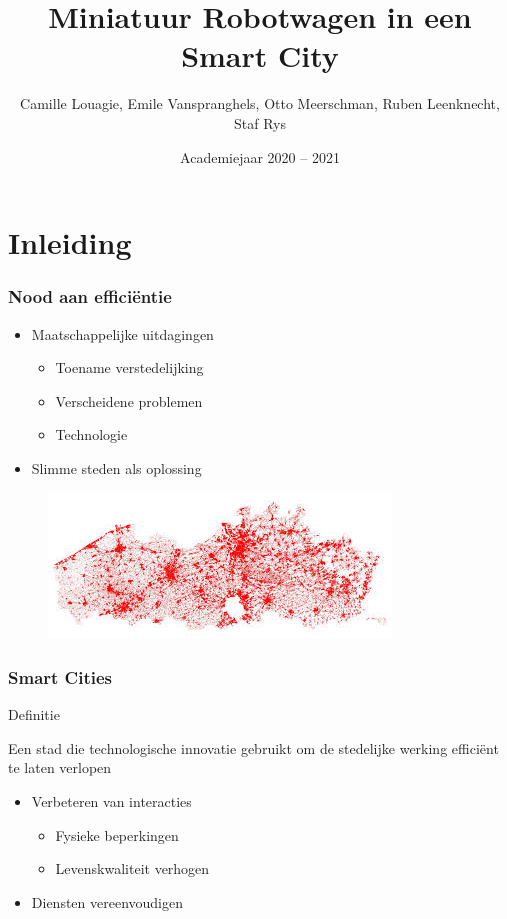 \documentclass[aspectratio=169,kulak,t,handout]{kulakbeamer} %
\title[Beamer]{Miniatuur Robotwagen in een Smart City}
\author{Camille Louagie, Emile Vanspranghels, Otto Meerschman, Ruben Leenknecht, Staf Rys}
\institute[Kulak]{KU Leuven Kulak}
\date{Academiejaar 2020 -- 2021}
\begin{document}
\begin{titleframe}
\titlepage
\end{titleframe}

\begin{outlineframe}[Overzicht]
\tableofcontents
\end{outlineframe}

\section{Inleiding}

\begin{frame}
	\frametitle{Nood aan efficiëntie}
	\begin{itemize}
		\item  Maatschappelijke uitdagingen
		\begin{itemize}
			\item Toename verstedelijking
			\item Verscheidene problemen
			\item Technologie
		\end{itemize}
		\item Slimme steden als oplossing
	\end{itemize}
	
	\begin{figure}
		\centering
		\includegraphics[width=.60\textwidth]{ruimtelijkestaat}
		
		\label{fig:CAD-model}
	\end{figure}
	
\end{frame}

\begin{frame}
	\frametitle{Smart Cities}
	
\begin{block}{Definitie}
	
	Een stad die technologische innovatie gebruikt om de stedelijke werking efficiënt te laten verlopen
	
\end{block}	
	\begin{itemize}
		\item  Verbeteren van interacties
		\begin{itemize}
			\item Fysieke beperkingen
			\item Levenskwaliteit verhogen
		\end{itemize}
		\item  Diensten vereenvoudigen
	\end{itemize}



\end{frame}
\end{document}
